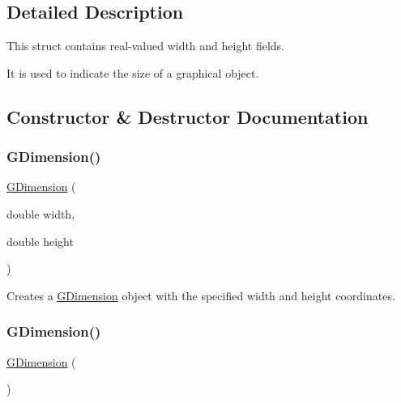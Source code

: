 \subsection{Detailed Description}
This struct contains real-\/valued width and height fields. 

It is used to indicate the size of a graphical object. 

\subsection{Constructor \& Destructor Documentation}
\mbox{\label{structGDimension_a0b3f30cd49c082f8e0245af828bd9000}} 
\subsubsection{\texorpdfstring{G\+Dimension()}{GDimension()}\hspace{0.1cm}{\footnotesize\ttfamily [1/2]}}
{\footnotesize\ttfamily \mbox{\hyperlink{structGDimension}{G\+Dimension}} (\begin{DoxyParamCaption}\item[{double}]{width,  }\item[{double}]{height }\end{DoxyParamCaption})}



Creates a {\ttfamily \mbox{\hyperlink{structGDimension}{G\+Dimension}}} object with the specified {\ttfamily width} and {\ttfamily height} coordinates. 

\mbox{\label{structGDimension_aedebfb3f99b96fb04c9f16926d11fcc5}} 
\subsubsection{\texorpdfstring{G\+Dimension()}{GDimension()}\hspace{0.1cm}{\footnotesize\ttfamily [2/2]}}
{\footnotesize\ttfamily \mbox{\hyperlink{structGDimension}{G\+Dimension}} (\begin{DoxyParamCaption}{ }\end{DoxyParamCaption})}



